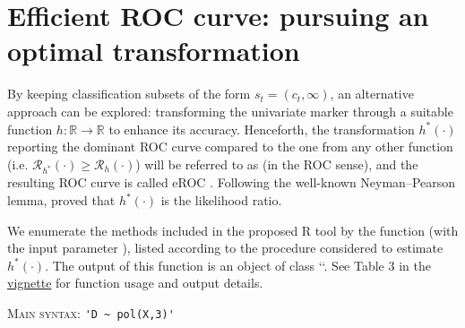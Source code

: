 
\section{Efficient ROC curve: pursuing an optimal transformation} \label{section:efficientroc}

By keeping classification subsets of the form $s_t = (c_t, \infty)$, an alternative approach can be explored: transforming the univariate marker through a suitable function $h: \mathbb{R} \longrightarrow \mathbb{R}$ to enhance its accuracy.
Henceforth, the transformation $h^*(\cdot)$ reporting the dominant ROC curve compared to the one from any other function (i.e. $\mathcal{R}_{h^*}(\cdot) \geq \mathcal{R}_h(\cdot)$) will be referred to as  (in the ROC sense), and the resulting ROC curve is called eROC \citep{Kauppi2016}. Following the well-known Neyman–Pearson lemma, \citet{McIntosh2002} proved that $h^*(\cdot)$ is the likelihood ratio.

We enumerate the methods included in the proposed R tool by the  function (with the input parameter ), listed according to the procedure considered to estimate $h^*(\cdot)$. The output of this function is an object of class ``. See Table 3 in the \href{https://cran.r-project.org/web/packages/movieROC/vignettes/movieROC_vignette.pdf}{vignette} for function usage and output details.

\textsc{Main syntax:}  \hspace{3mm}
 \verb"'D ~ pol(X,3)'" 

